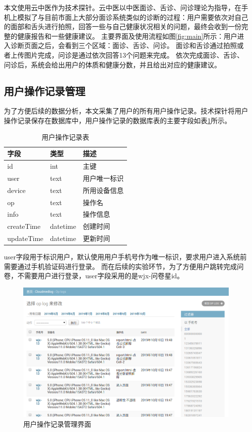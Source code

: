 本文使用云中医作为技术探针。云中医以中医面诊、舌诊、问诊理论为指导，在手机上模拟了与目前市面上大部分面诊系统类似的诊断的过程：用户需要依次对自己的面部和舌头进行拍照，回答一些与自己健康状况相关的问题，最终会收到一份完整的健康报告和一些健康建议。
主要界面及使用流程如图\ref{fig:main}所示：用户进入诊断页面之后，会看到三个区域：面诊、舌诊、问诊。
面诊和舌诊通过拍照或者上传图片完成，问诊是通过依次回答13个问题来完成。
依次完成面诊、舌诊、问诊后，系统会给出用户的体质和健康分数，并且给出对应的健康建议。


\subsection{用户操作记录管理}
为了方便后续的数据分析，本文采集了用户的所有用户操作记录。技术探针将用户操作记录保存在数据库中，用户操作记录的数据库表的主要字段如表\ref{tab:op_log}所示。

\begin{table}[]
    \centering
    \caption{用户操作记录表}
    \begin{tabular}{lll}
        \toprule
        字段 & 类型 & 描述 \\
        \midrule
        id & int & 主键 \\
        user & text & 用户唯一标识 \\
        device & text & 所用设备信息 \\
        op & text & 操作名 \\
        info & text & 操作信息 \\
        createTime & datetime & 创建时间 \\
        updateTime & datetime & 更新时间\\
        \bottomrule
    \end{tabular}
    \label{tab:op_log}
\end{table}


user字段用于标识用户，默认使用用户手机号作为唯一标识，要求用户进入系统前需要通过手机验证码进行登录。
而在后续的实验环节，为了方便用户跳转完成问卷，不需要用户进行登录，user字段采用的是wjx-问卷星id。

\begin{figure}[ht]
    \centering
    \includegraphics[width=12cm]{images/op_log.png}
    \caption{用户操作记录管理界面}
    \label{fig:op_log}
\end{figure}

